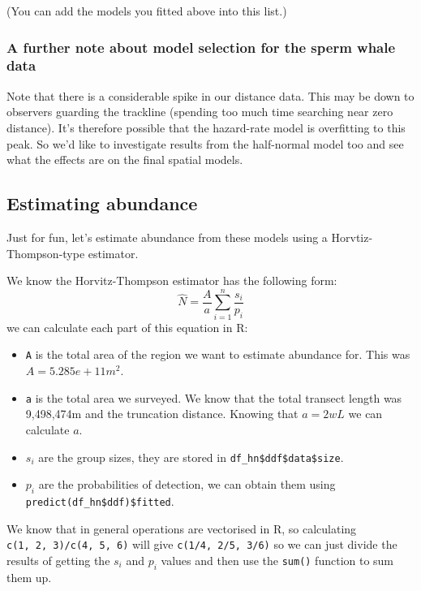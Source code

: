 \documentclass[]{book}
\providecommand{\tightlist}{%
  \setlength{\itemsep}{0pt}\setlength{\parskip}{0pt}}
\theoremstyle{definition}
\theoremstyle{definition}
\theoremstyle{remark}
\begin{document}
(You can add the models you fitted above into this list.)

\subsubsection{A further note about model selection for the sperm whale
data}\label{a-further-note-about-model-selection-for-the-sperm-whale-data}

Note that there is a considerable spike in our distance data. This may
be down to observers guarding the trackline (spending too much time
searching near zero distance). It's therefore possible that the
hazard-rate model is overfitting to this peak. So we'd like to
investigate results from the half-normal model too and see what the
effects are on the final spatial models.

\subsection{Estimating abundance}\label{estimating-abundance}

Just for fun, let's estimate abundance from these models using a
Horvtiz-Thompson-type estimator.

We know the Horvitz-Thompson estimator has the following form: \[
\hat{N} = \frac{A}{a} \sum_{i=1}^n \frac{s_i}{p_i}
\] we can calculate each part of this equation in R:

\begin{itemize}
\tightlist
\item
  \texttt{A} is the total area of the region we want to estimate
  abundance for. This was \(A=5.285e+11 m^2\).
\item
  \texttt{a} is the total area we surveyed. We know that the total
  transect length was 9,498,474m and the truncation distance. Knowing
  that \(a=2wL\) we can calculate \(a\).
\item
  \(s_i\) are the group sizes, they are stored in
  \texttt{df\_hn\$ddf\$data\$size}.
\item
  \(p_i\) are the probabilities of detection, we can obtain them using
  \texttt{predict(df\_hn\$ddf)\$fitted}.
\end{itemize}

We know that in general operations are vectorised in R, so calculating
\texttt{c(1,\ 2,\ 3)/c(4,\ 5,\ 6)} will give \texttt{c(1/4,\ 2/5,\ 3/6)}
so we can just divide the results of getting the \(s_i\) and \(p_i\)
values and then use the \texttt{sum()} function to sum them up.
\end{document}

